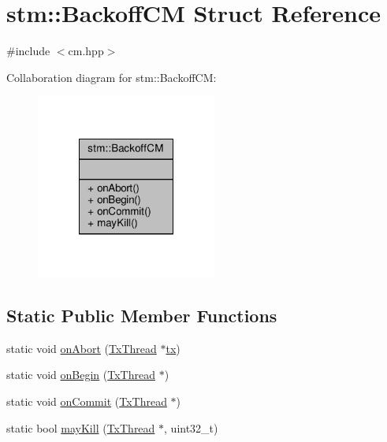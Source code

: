 \hypertarget{structstm_1_1BackoffCM}{\section{stm\-:\-:Backoff\-C\-M Struct Reference}
\label{structstm_1_1BackoffCM}
}


{\ttfamily \#include $<$cm.\-hpp$>$}



Collaboration diagram for stm\-:\-:Backoff\-C\-M\-:
\nopagebreak
\begin{figure}[H]
\begin{center}
\leavevmode
\includegraphics[width=168pt]{structstm_1_1BackoffCM__coll__graph}
\end{center}
\end{figure}
\subsection*{Static Public Member Functions}
\begin{DoxyCompactItemize}
\item 
static void \hyperlink{structstm_1_1BackoffCM_af553f755ae5d32b484866638953af24f}{on\-Abort} (\hyperlink{structstm_1_1TxThread}{Tx\-Thread} $\ast$\hyperlink{stmskip_8cc_a0f1c58699b83ce5a08bd9ee859250d72}{tx})
\item 
static void \hyperlink{structstm_1_1BackoffCM_a8c47abe713d8739274ef4a122bab9711}{on\-Begin} (\hyperlink{structstm_1_1TxThread}{Tx\-Thread} $\ast$)
\item 
static void \hyperlink{structstm_1_1BackoffCM_a94b113bc9e5e55b87b8b75fa1c96bb13}{on\-Commit} (\hyperlink{structstm_1_1TxThread}{Tx\-Thread} $\ast$)
\item 
static bool \hyperlink{structstm_1_1BackoffCM_a3a4ad9abc01889c23ae9177e01c629ad}{may\-Kill} (\hyperlink{structstm_1_1TxThread}{Tx\-Thread} $\ast$, uint32\-\_\-t)
\end{DoxyCompactItemize}



